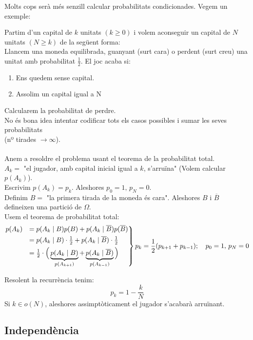 Molts cops serà més senzill calcular probabilitats condicionades. Vegem un exemple:
\begin{example}
  Partim d'un capital de $k$ unitats $(k \geq 0)$ i volem aconseguir un capital de $N$ unitats $(N\geq k)$ 
  de la següent forma: \\
  Llancem una moneda equilibrada, guanyant (surt cara) o perdent (surt creu) una unitat amb probabilitat 
  $\frac{1}{2}$. El joc acaba si: 
  \begin{enumerate}
      \item Ens quedem sense capital.
      \item Assolim un capital igual a N
  \end{enumerate}
  Calcularem la probabilitat de perdre. \\
  No és bona idea intentar codificar tots els casos possibles i sumar les seves probabilitats \\ 
  (nº tirades $\to \infty$). \\\\
  
  Anem a resoldre el problema usant el teorema de la probabilitat total. \\
  $A_{k} = $ "el jugador, amb capital inicial igual a $k$, s'arruïna" (Volem calcular $p(A_{k})$). \\
  Escrivim $p(A_{k}) = p_{k}$. Aleshores $p_{0} = 1, \, p_{N} = 0$. \\
  Definim $B =$ "la primera tirada de la moneda és cara". Aleshores $B$ i $\overline{B}$ defineixen 
  una partició de $\Omega$. \\
  Usem el teorema de probabilitat total:
  \[
    \begin{rcases}
        p(A_{k}) &= p(A_{k} \mid B)p(B) + p(A_{k}\mid \overline{B})p(\overline{B}) \\
        &= p(A_{k}\mid B)\cdot\frac{1}{2} + p(A_{k}\mid\overline{B})\cdot\frac{1}{2} \\
        &= \frac{1}{2} \cdot\Big( \underbrace{p(A_{k}\mid B)}_{p(A_{k+1})} + \underbrace{p(A_{k}\mid\overline{B})}_{p(A_{k-1})}\Big)
    \end{rcases} p_{k} = \frac{1}{2}(p_{k+1} + p_{k-1}); \quad p_{0} = 1, \, p_{N} = 0
  \]
  
  Resolent la recurrència tenim: 
  \[
    p_{k} = 1 - \frac{k}{N}
  \]
  Si $k \in o(N)$, aleshores assimptòticament el jugador s'acabarà arruïnant.
\end{example}

\subsection{Independència}

